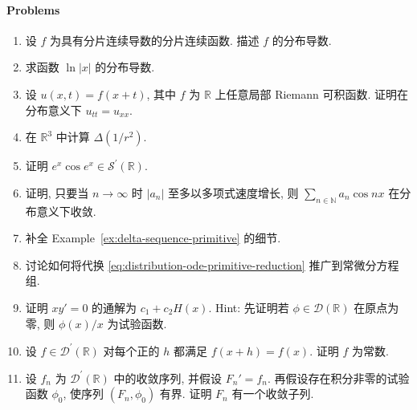 \paragraph*{Problems}

\begin{enumerate}[label=\thesection.\arabic*.,ref=\thesection.\arabic*,start=20,series=book-problems]

\item\label{ex:piecewise-smooth-distribution-derivative} 设 $f$ 为具有分片连续导数的分片连续函数. 描述 $f$ 的分布导数.

\item\label{ex:logarithm-distribution-derivative} 求函数 $\ln|x|$ 的分布导数.

\item\label{ex:riemann-integrable-traveling-wave} 设 $u(x,t)=f(x+t)$, 其中 $f$ 为 $\mathbb{R}$ 上任意局部 Riemann 可积函数. 证明在分布意义下 $u_{tt}=u_{xx}$.

\item\label{ex:inverse-square-distribution-laplacian} 在 $\mathbb{R}^3$ 中计算 $\Delta(1/r^2)$.

\item\label{ex:exponential-oscillation-tempered} 证明 $e^x\cos e^x\in\mathcal{S}^{\prime}(\mathbb{R})$.

\item\label{ex:polynomial-cosine-coefficients-distribution} 证明, 只要当 $n\to\infty$ 时 $|a_n|$ 至多以多项式速度增长, 则 $\sum_{n\in\mathbb{N}}a_n\cos nx$ 在分布意义下收敛.

\item\label{ex:prove-delta-primitive-conditions} 补全 Example~\ref{ex:delta-sequence-primitive} 的细节.

\item\label{ex:distribution-ode-system-substitution} 讨论如何将代换 \eqref{eq:distribution-ode-primitive-reduction} 推广到常微分方程组.

\item\label{ex:singular-ode-heaviside-general-solution} 证明 $xy'=0$ 的通解为 $c_1+c_2H(x)$. Hint: 先证明若 $\phi\in\mathcal{D}(\mathbb{R})$ 在原点为零, 则 $\phi(x)/x$ 为试验函数.

\item\label{ex:translation-invariant-distribution-constant} 设 $f\in\mathcal{D}^{\prime}(\mathbb{R})$ 对每个正的 $h$ 都满足 $f(x+h)=f(x)$. 证明 $f$ 为常数.

\item\label{ex:distribution-primitives-convergent-subsequence} 设 $f_n$ 为 $\mathcal{D}^{\prime}(\mathbb{R})$ 中的收敛序列, 并假设 $F_n'=f_n$. 再假设存在积分非零的试验函数 $\phi_0$, 使序列 $(F_n,\phi_0)$ 有界. 证明 $F_n$ 有一个收敛子列.


\end{enumerate}
